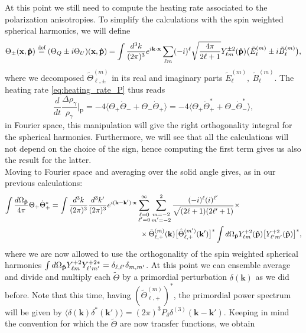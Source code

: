 At this point we still need to compute the heating rate associated to the polarization anisotropies. To simplify the calculations with the spin weighted spherical harmonics, we will define $$\Theta_{\pm}(\mathbf{x,\mathbf{\hat{p}}})\stackrel{\text{def}}{=}(\Theta_Q\pm i\Theta_U)(\mathbf{x,\mathbf{\hat{p}}})=\int\frac{d^3k}{(2\pi)^3}e^{i\mathbf{k}\cdot\mathbf{x}}\sum_{\ell m} (-i)^{\ell}\sqrt{\frac{4\pi}{2\ell+1}}Y^{\pm2}_{\ell m}(\mathbf{\hat{p}})\big(\tilde E_{\ell}^{(m)}\pm i\tilde B_\ell^{(m)}\big),$$
where we decomposed  $\tilde\Theta_{\ell,\pm}^{(m)}$ in its real and imaginary parts $\tilde E_{\ell}^{(m)},\ \tilde B_\ell^{(m)}
$. The heating rate \eqref{eq:heating_rate_P} thus reads 
$$\frac{d}{dt}\frac{\Delta \rho_\gamma}{\rho_\gamma}\bigg|_\text{P}=-4\langle\Theta_+\dot\Theta_-+\Theta_-\dot\Theta_+\rangle=-4\langle\Theta_+\dot\Theta_+^*+\Theta_-\dot\Theta_-^*\rangle,$$ in Fourier space, this manipulation will give the right orthogonality integral for the spherical harmonics. Furthermore, we will see that all the calculations will not depend on the choice of the sign, hence computing the first term gives us also the result for the latter.\\
Moving to Fourier space and averaging over the solid angle gives, as in our previous calculations:
\begin{align*}
    \int\frac{d\Omega_{\mathbf{\hat{p}}}}{4\pi}\Theta_+\dot \Theta_+^*&=\int\frac{d^3k}{(2\pi)^3}\frac{d^3k'}{(2\pi)^3}e^{i(\mathbf{k}-\mathbf{k}')\cdot\mathbf{x}}\sum_{\substack{\ell=0\\\ell'=0}}^{\infty}\sum_{\substack{m=-2\\m'=-2}}^{2}\frac{(-i)^{\ell}(i)^{\ell'}}{\sqrt{(2\ell+1)(2\ell'+1)}}\times\\&\qquad\qquad\qquad\qquad\qquad\qquad\times\tilde\Theta_{\ell,+}^{(m)}(\mathbf{k})\big[\dot{\tilde\Theta}_{\ell,+}^{(m')}(\mathbf{k}')\big]^*\int d\Omega_{\mathbf{\hat{p}}} Y^{+2}_{\ell m}(\mathbf{\hat{p}})\big[Y^{+2}_{\ell' m'}(\mathbf{\hat{p}})\big]^*,
\end{align*}
where we are now allowed to use the orthogonality of the spin weighted spherical harmonics $\int d\Omega_{\mathbf{\hat{p}}} Y^{+2}_{\ell m}Y^{+2*}_{\ell' m'}=\delta_{\ell, \ell'}\delta_{m,m'}$. At this point we can ensemble average and divide and multiply each $\tilde\Theta$ by a primordial perturbation $\delta(\mathbf{k})$ as we did before. Note that this time, having $(\tilde\Theta_{\ell,+}^{(m)})^*$, the primordial power spectrum will be given by $\langle\delta(\mathbf{k})\delta^*(\mathbf{k'})\rangle=(2\pi)^3{P}_\delta\delta^{(3)}(\mathbf{k}-\mathbf{k}')$. Keeping in mind the convention for which the $\tilde\Theta$ are now transfer functions, we obtain

